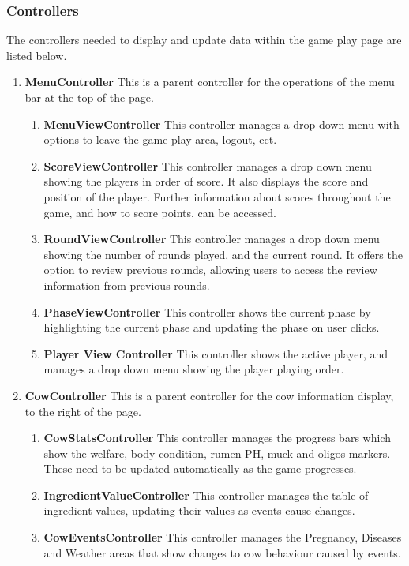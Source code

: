\subsubsection{Controllers}
The controllers needed to display and update data within the game play page are listed below.
\begin{enumerate}
	\item \textbf{MenuController} This is a parent controller for the operations of the menu bar at the top of the page.
	\begin{enumerate}
		\item \textbf{MenuViewController} This controller manages a drop down menu with options to leave the game play area, logout, ect.
		\item \textbf{ScoreViewController} This controller manages a drop down menu showing the players in order of score. It also displays the score and position of the player. Further information about scores throughout the game, and how to score points, can be accessed.
		\item \textbf{RoundViewController} This controller manages a drop down menu showing the number of rounds played, and the current round. It offers the option to review previous rounds, allowing users to access the review information from previous rounds.
		\item \textbf{PhaseViewController} This controller shows the current phase by highlighting the current phase and updating the phase on user clicks.
		\item \textbf{Player View Controller} This controller shows the active player, and manages a drop down menu showing the player playing order.
	\end{enumerate}

	\item \textbf{CowController}
This is a parent controller for the cow information display, to the right of the page.
	\begin{enumerate}
		\item \textbf{CowStatsController} This controller manages the progress bars which show the welfare, body condition, rumen PH, muck and oligos markers. These need to be updated automatically as the game progresses.
		\item \textbf{IngredientValueController} This controller manages the table of ingredient values, updating their values as events cause changes.
		\item \textbf{CowEventsController} This controller manages the Pregnancy, Diseases and Weather areas that show changes to cow behaviour caused by events.
	\end{enumerate}


\end{enumerate}
